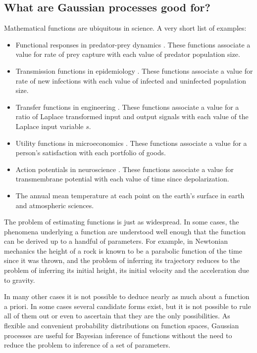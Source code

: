 \subsection{What are Gaussian processes good for?}\label{sub:applications}
Mathematical functions are ubiquitous in science. A very short list of examples:
\begin{itemize}
    \item Functional responses in predator-prey dynamics \cite{mathecol}. These functions associate a value for rate of prey capture with each value of predator population size.
    \item Transmission functions in epidemiology \cite{andersonmay}. These functions associate a value for rate of new infections with each value of infected and uninfected population size.
    \item Transfer functions in engineering \cite{duffy}. These functions associate a value for a ratio of Laplace transformed input and output signals with each value of the Laplace input variable $s$.
    \item Utility functions in microeconomics \cite{microecon}. These functions associate a value for a person's satisfaction with each portfolio of goods.
    \item Action potentials in neuroscience \cite{neuro}. These functions associate a value for transmembrane potential with each value of time since depolarization.
    \item The annual mean temperature at each point on the earth's surface in earth and atmospheric sciences.
\end{itemize}

The problem of estimating functions is just as widespread. In some cases, the phenomena underlying a function are understood well enough that the function can be derived up to a handful of parameters. For example, in Newtonian mechanics the height of a rock is known to be a parabolic function of the time since it was thrown, and the problem of inferring its trajectory reduces to the problem of inferring its initial height, its initial velocity and the acceleration due to gravity.

In many other cases it is not possible to deduce nearly as much about a function a priori. In some cases several candidate forms exist, but it is not possible to rule all of them out or even to ascertain that they are the only possibilities. As flexible and convenient probability distributions on function spaces, Gaussian processes are useful for Bayesian inference of functions without the need to reduce the problem to inference of a set of parameters.

